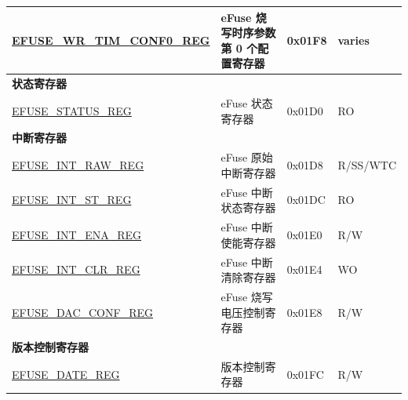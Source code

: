 \begin{longtable}{ | p{6.8cm} | p{7cm} | p{1.3cm} | p{1.2cm} | }
\hyperref[regdesc:EFUSEWRTIMCONF0REG]{EFUSE\_WR\_TIM\_CONF0\_REG} & eFuse 烧写时序参数第 0 个配置寄存器 & 0x01F8 & varies \\ \hline
\multicolumn{4}{|l|}{\textbf{状态寄存器}} \\ \hline
\hyperref[regdesc:EFUSESTATUSREG]{EFUSE\_STATUS\_REG} & eFuse 状态寄存器 & 0x01D0 & RO \\ \hline
\multicolumn{4}{|l|}{\textbf{中断寄存器}} \\ \hline
\hyperref[regdesc:EFUSEINTRAWREG]{EFUSE\_INT\_RAW\_REG} & eFuse 原始中断寄存器 & 0x01D8 & R/SS/WTC \\ \hline
\hyperref[regdesc:EFUSEINTSTREG]{EFUSE\_INT\_ST\_REG} & eFuse 中断状态寄存器 & 0x01DC & RO \\ \hline
\hyperref[regdesc:EFUSEINTENAREG]{EFUSE\_INT\_ENA\_REG} & eFuse 中断使能寄存器 & 0x01E0 & R/W \\ \hline
\hyperref[regdesc:EFUSEINTCLRREG]{EFUSE\_INT\_CLR\_REG} & eFuse 中断清除寄存器 & 0x01E4 & WO \\ \hline
\hyperref[regdesc:EFUSEDACCONFREG]{EFUSE\_DAC\_CONF\_REG} & eFuse 烧写电压控制寄存器 & 0x01E8 & R/W \\ \hline
\multicolumn{4}{|l|}{\textbf{版本控制寄存器}} \\ \hline
\hyperref[regdesc:EFUSEDATEREG]{EFUSE\_DATE\_REG} & 版本控制寄存器 & 0x01FC & R/W \\ \hline
\end{longtable}
